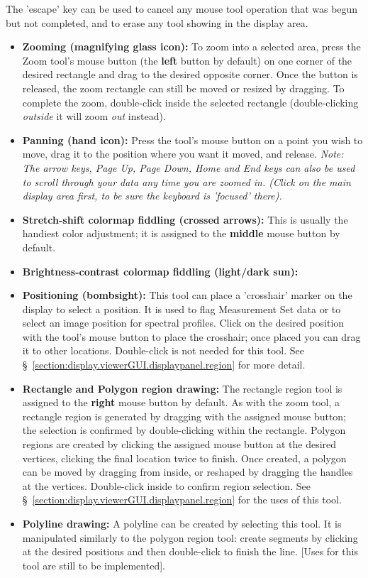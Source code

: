 The 'escape' key can be used to cancel any mouse tool operation that was
begun but not completed, and to erase any tool showing in the display area.
\begin{itemize}
   \item {\bf Zooming (magnifying glass icon):}
     To zoom into a selected area, press the Zoom tool's mouse button
     (the {\bf left} button by default) on one corner of the desired
     rectangle and drag to the desired opposite corner. Once the button is
     released, the zoom rectangle can still be moved or resized by dragging.
     To complete the zoom, double-click inside the selected rectangle
     (double-clicking {\it outside} it will zoom {\it out} instead).
   \item {\bf Panning (hand icon):} Press the tool's mouse button on a 
     point you wish to move, drag it to the position where you want it
     moved, and release. {\it Note: The arrow keys, Page Up, Page Down,
     Home and End keys can also be used to scroll through your data any time
     you are zoomed in. (Click on the main display area first, to be sure
     the keyboard is 'focused' there).}
   \item {\bf Stretch-shift colormap fiddling (crossed arrows):} This is
     usually the handiest color adjustment; it is assigned to the {\bf middle}
     mouse button by default.
   \item {\bf Brightness-contrast colormap fiddling (light/dark sun):} 
   \item {\bf Positioning (bombsight):} This tool can place a 'crosshair'
     marker on the display to select a position. It is used to flag
     Measurement Set data or to select an image position for spectral profiles.
     Click on the desired position with the tool's mouse button to place
     the crosshair; once placed you can drag it to other locations.
     Double-click is not needed for this tool.  
     See \S~\ref{section:display.viewerGUI.displaypanel.region} for more
     detail.
   \item {\bf Rectangle and Polygon region drawing:} The rectangle region tool
     is assigned to the {\bf right} mouse button by default. As with the zoom
     tool, a rectangle region is generated by dragging with the assigned mouse
     button; the selection is confirmed by double-clicking within the rectangle.
     Polygon regions are created by clicking the assigned mouse button
     at the desired vertices, clicking the final location twice to finish.
     Once created, a polygon can be moved by dragging from inside, or
     reshaped by dragging the handles at the vertices.  Double-click inside to
     confirm region selection.
     See \S~\ref{section:display.viewerGUI.displaypanel.region} for the uses
     of this tool.
   \item {\bf Polyline drawing:}
     A polyline can be created by selecting this tool. It is manipulated
     similarly to the polygon region tool: create segments by clicking at
     the desired positions and then double-click to finish the line.
     [Uses for this tool are still to be implemented].
\end{itemize}

